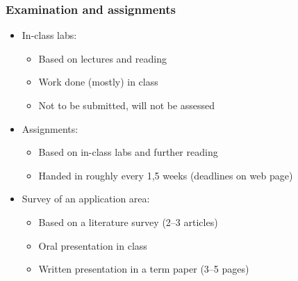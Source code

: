 \documentclass[dvipsnames]{beamer}
\begin{document}
\begin{frame}
\frametitle{Examination and assignments}
\begin{itemize}
\item In-class labs:
  \begin{itemize}
  \item Based on lectures and reading
  \item Work done (mostly) in class
  \item Not to be submitted, will not be assessed
  \end{itemize}
\item<2-> Assignments:
  \begin{itemize}
  \item Based on in-class labs and further reading
  \item Handed in roughly every 1,5 weeks (deadlines on web page)
  \end{itemize}
\item<3-> Survey of an application area:
  \begin{itemize}
  \item Based on a literature survey (2--3 articles)
  \item Oral presentation in class
  \item Written presentation in a term paper (3--5 pages)
  \end{itemize}
\end{itemize}
\end{frame}
\end{document}
